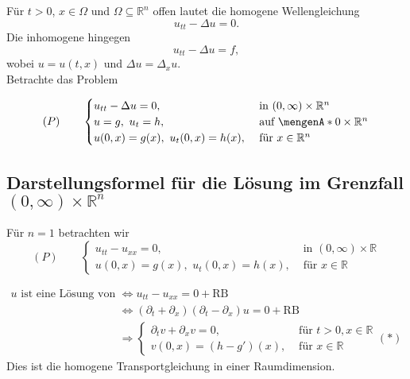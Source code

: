 Für $t>0$, $x \in \Omega$ und $\Omega \subseteq \mathbb{R}^n$ offen lautet die homogene Wellengleichung
\[
	u_{tt} - \Delta u = 0.
\]
Die inhomogene hingegen
\[
	u_{tt} - \Delta u = f,
\]
wobei $u = u(t,x)$ und $ \Delta u = \Delta_x u$. \\
Betrachte das Problem

\[
	(P) \qquad  \begin{cases}
		u_{tt} - \Delta u = 0, &\text{ in }(0,\infty) \times \mathbb{R}^n\\
		u = g, \,\, u_t = h ,&\text{ auf } \set{0} \times \mathbb{R}^n \\
		u(0,x) = g(x), \,\, u_t(0,x) = h(x) ,&\text{ für } x \in \mathbb{R}^n
	\end{cases}
\]

 \subsection{Darstellungsformel für die Lösung im Grenzfall $(0,\infty) \times \mathbb{R}^n$} 
 \label{sub:darstellungsformel_fur_die_losung_im_grenzfall}

Für $n=1$ betrachten wir
\[
	(P) \qquad  \begin{cases}
		u_{tt}- u_{xx} = 0, &\text{ in }(0,\infty) \times \mathbb{R}\\
		u(0,x) = g(x), \,\,u_t(0,x) = h(x) ,&\text{ für } x \in \mathbb{R}
	\end{cases}
\]

\begin{align*}
u \text{ ist eine Lösung von (P)} &\Leftrightarrow u_{tt}-u_{xx}=0 + \text{RB} \\
& \Leftrightarrow ( \partial_t + \partial_x)( \partial_t - \partial_x)u = 0 + \text{RB} \\
& \Rightarrow \begin{cases}
	\partial_t v + \partial_x v =0, &\text{ für }t>0, x \in \mathbb{R}\\
	v(0,x)= (h-g')(x), &\text{ für }x \in \mathbb{R}
\end{cases}(*)
\end{align*} 
Dies ist die homogene Transportgleichung in einer Raumdimension.

